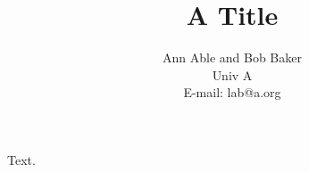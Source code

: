 \documentclass{article}
\begin{document}
\title{A Title}
\author{Ann Able and Bob Baker\\
Univ A\\
E-mail: lab@a.org}
\maketitle
Text.
\end{document}
